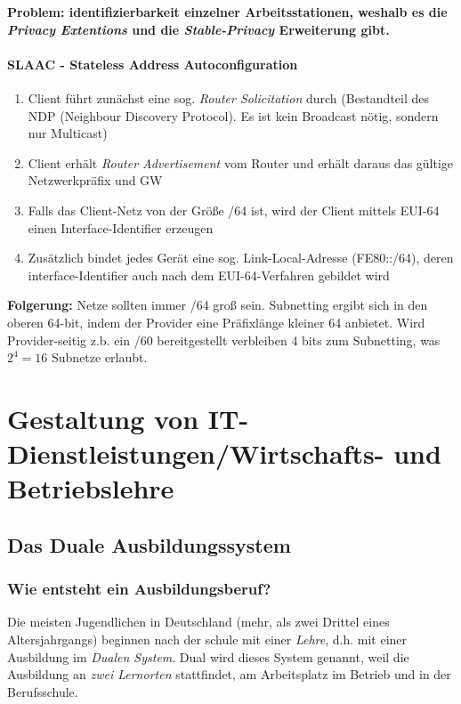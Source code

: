 \documentclass[a4paper, 12pt]{report}
\begin{document}
\noindent \textbf{Problem: identifizierbarkeit einzelner Arbeitsstationen,
weshalb es die \emph{Privacy Extentions} und die \emph{Stable-Privacy}
Erweiterung gibt.}

\subsubsection{SLAAC - Stateless Address Autoconfiguration}

\begin{enumerate}
	\item Client führt zunächst eine sog. \emph{Router Solicitation} durch
		(Bestandteil des NDP (Neighbour Discovery Protocol). Es ist kein
		Broadcast nötig, sondern nur Multicast)
	\item Client erhält \emph{Router Advertisement} vom Router und erhält
		daraus das gültige Netzwerkpräfix und GW
	\item Falls das Client-Netz von der Größe /64 ist, wird der Client
		mittels EUI-64 einen Interface-Identifier erzeugen
	\item Zusätzlich bindet jedes Gerät eine sog. Link-Local-Adresse
		(FE80::/64), deren interface-Identifier auch nach dem
		EUI-64-Verfahren gebildet wird
\end{enumerate}

\textbf{Folgerung:} Netze sollten immer /64 groß sein. Subnetting ergibt sich in
den oberen 64-bit, indem der Provider eine Präfixlänge kleiner 64 anbietet. Wird
Provider-seitig z.b. ein /60 bereitgestellt verbleiben 4 bits zum Subnetting,
was $2^{4} = 16$ Subnetze erlaubt.



\chapter{Gestaltung von IT-Dienstleistungen/Wirtschafts- und Betriebslehre}

\section{Das Duale Ausbildungssystem}

\subsection{Wie entsteht ein Ausbildungsberuf?}

Die meisten Jugendlichen in Deutschland (mehr, als zwei Drittel eines
Altersjahrgangs) beginnen nach der schule mit einer \emph{Lehre}, d.h. mit
einer Ausbildung im \emph{Dualen System}. Dual wird dieses System genannt, weil
die Ausbildung an \emph{zwei Lernorten} stattfindet, am Arbeitsplatz im Betrieb
und in der Berufsschule. \\
\end{document}
